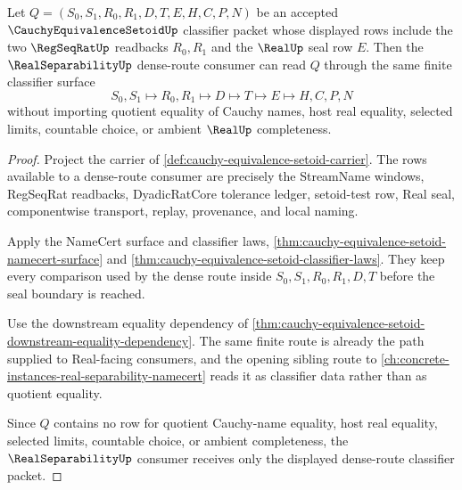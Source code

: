 \begin{theorem}
\label{thm:cauchy-equivalence-real-separability-backward-link}
Let $Q=(S_0,S_1,R_0,R_1,D,T,E,H,C,P,N)$ be an accepted $\CauchyEquivalenceSetoidUp$ classifier packet whose displayed rows include the two $\RegSeqRatUp$ readbacks $R_0,R_1$ and the $\RealUp$ seal row $E$. Then the $\RealSeparabilityUp$ dense-route consumer can read $Q$ through the same finite classifier surface
$$
S_0,S_1 \longmapsto R_0,R_1 \longmapsto D \longmapsto T \longmapsto E \longmapsto H,C,P,N
$$
without importing quotient equality of Cauchy names, host real equality, selected limits, countable choice, or ambient $\RealUp$ completeness.
\end{theorem}
\begin{proof}
Project the carrier of \autoref{def:cauchy-equivalence-setoid-carrier}. The rows available to a dense-route consumer are precisely the StreamName windows, RegSeqRat readbacks, DyadicRatCore tolerance ledger, setoid-test row, Real seal, componentwise transport, replay, provenance, and local naming.

Apply the NameCert surface and classifier laws, \autoref{thm:cauchy-equivalence-setoid-namecert-surface} and \autoref{thm:cauchy-equivalence-setoid-classifier-laws}. They keep every comparison used by the dense route inside $S_0,S_1,R_0,R_1,D,T$ before the seal boundary is reached.

Use the downstream equality dependency of \autoref{thm:cauchy-equivalence-setoid-downstream-equality-dependency}. The same finite route is already the path supplied to Real-facing consumers, and the opening sibling route to \autoref{ch:concrete-instances-real-separability-namecert} reads it as classifier data rather than as quotient equality.

Since $Q$ contains no row for quotient Cauchy-name equality, host real equality, selected limits, countable choice, or ambient completeness, the $\RealSeparabilityUp$ consumer receives only the displayed dense-route classifier packet.
\end{proof}

